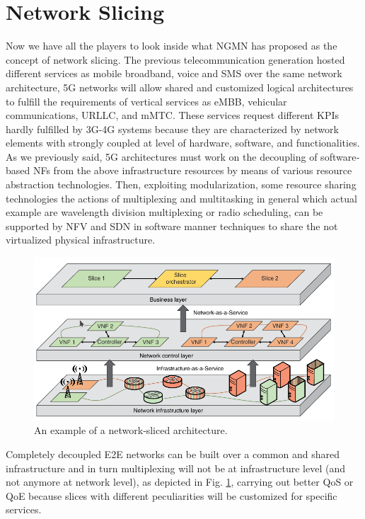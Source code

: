 \documentclass[a4paper,12pt]{report} %
\begin{document}
\section{Network Slicing} 
Now we have all the players to look inside what NGMN has proposed as the concept of network slicing. The previous telecommunication generation hosted different services as mobile broadband, voice and SMS over the same network architecture, 5G networks will allow shared and customized logical architectures to fulfill the requirements of vertical services as \gls{eMBB}, vehicular communications, \gls{URLLC}, and \gls{mMTC}. These services request different KPIs hardly fulfilled by 3G-4G systems because they are characterized by  network elements with strongly coupled at level of hardware, software, and functionalities. \\
As we previously said, 5G architectures must work on the decoupling of software‐based NFs from the above infrastructure resources by
means of various resource abstraction technologies. Then, exploiting modularization, some resource sharing technologies the actions of multiplexing and multitasking in general which actual example are 
wavelength division multiplexing or radio scheduling, can be supported by NFV and SDN
in software manner techniques to share the not virtualized physical infrastructure.
\begin{figure}[H]
\centering
\includegraphics[scale=0.55]{pics/slice.png}
\caption{An example of a network‐sliced architecture. \cite{al20185g}} 
\label{slice}
\end{figure}
Completely decoupled E2E networks can be built over a common and shared infrastructure and in turn multiplexing will not be at infrastructure level (and not anymore at network level), as depicted in Fig. \ref{slice}, carrying out better \gls{QoS} or \gls{QoE} because slices with different peculiarities will be customized for specific services.\\
\end{document}
